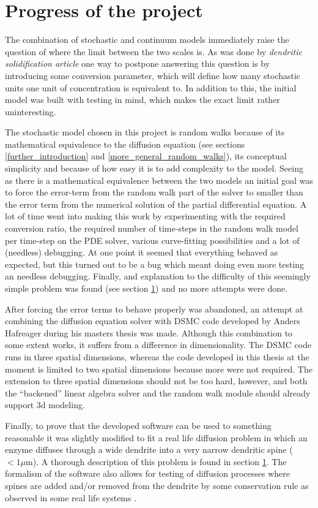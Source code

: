 \documentclass[main.tex]{subfiles}
\begin{document}
\section{Progress of the project}
The combination of stochastic and continuum models immediately raise the question of where the limit between the two scales is. 
As was done by \emph{dendritic solidification article} one way to postpone answering this question is by introducing some conversion parameter, which will define how many stochastic units one unit of concentration is equivalent to. 
In addition to this, the initial model was built with testing in mind, which makes the exact limit rather uninteresting. 

The stochastic model chosen in this project is random walks because of its mathematical equivalence to the diffusion equation (see sections \ref{further_introduction} and \ref{more_general_random_walks}), its conceptual simplicity and because of how easy it is to add complexity to the model. 
Seeing as there is a mathematical equivalence between the two models an initial goal was to force the error-term from the random walk part of the solver to smaller than the error term from the numerical solution of the partial differential equation. 
A lot of time went into making this work by experimenting with the required conversion ratio, the required number of time-steps in the random walk model per time-step on the PDE solver, various curve-fitting possibilities and a lot of (needless) debugging. 
At one point it seemed that everything behaved as expected, but this turned out to be a bug which meant doing even more testing an needless debugging. 
Finally, and explanation to the difficulty of this seemingly simple problem was found (see section \ref{}) and no more attempts were done. 

After forcing the error terms to behave properly was abandoned, an attempt at combining the diffusion equation solver with DSMC code developed by Anders Hafreager during his masters thesis was made. 
Although this combination to some extent works, it suffers from a difference in dimensionality. 
The DSMC code runs in three spatial dimensions, whereas the code developed in this thesis at the moment is limited to two spatial dimensions because more were not required. 
The extension to three spatial dimensions should not be too hard, however, and both the ``backened'' linear algebra solver and the random walk module should already support 3d modeling. 

Finally, to prove that the developed software can be used to something reasonable it was slightly modified to fit a real life diffusion problem in which an enzyme diffuses through a wide dendrite into a very narrow dendritic spine ($<1\mu$m). 
A thorough description of this problem is found in section \ref{}.
The formalism of the software also allows for testing of diffusion processes where spines are added and/or removed from the dendrite by some conservation rule as observed in some real life systems \cite{}.
\end{document}
